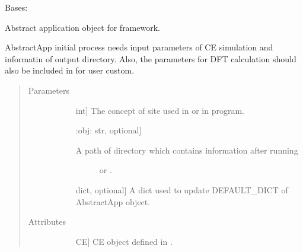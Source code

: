 \documentclass[letterpaper,10pt,english]{sphinxmanual}
\begin{document}
\begin{fulllineitems}
\label{\detokenize{pygace:pygace.gace.AbstractApp}}
\sphinxAtStartPar
Bases: 

\sphinxAtStartPar
Abstract application object for  framework.

\sphinxAtStartPar
AbstractApp initial process needs input parameters of CE simulation
and informatin of output directory. Also, the parameters for DFT
calculation should also be included in  for
user custom.
\begin{quote}\begin{description}
\item[{Parameters}] \leavevmode\begin{description}
\item[{}] \leavevmode{[}int{]}
\sphinxAtStartPar
The concept of site used in  or  in 
program.

\item[{}] \leavevmode{[}:obj: str, optional{]}\begin{description}
\item[{A path of directory which contains information after running}] \leavevmode
\sphinxAtStartPar
{} or .

\end{description}

\item[{}] \leavevmode{[}dict, optional{]}
\sphinxAtStartPar
A dict used to update DEFAULT\_DICT of AbstractApp object.

\end{description}

\item[{Attributes}] \leavevmode\begin{description}
\item[{}] \leavevmode{[}CE{]}
\sphinxAtStartPar
CE object defined in .


\end{description}
\end{description}
\end{quote}
\end{fulllineitems}
\end{document}
